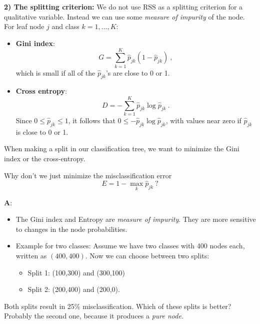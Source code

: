 \documentclass[
  10pt,
  ignorenonframetext,
]{beamer}
\providecommand{\tightlist}{%
  \setlength{\itemsep}{0pt}\setlength{\parskip}{0pt}}
\begin{document}
\begin{frame}
\textbf{2) The splitting criterion:} We do not use RSS as a splitting
criterion for a qualitative variable. Instead we can use some
\emph{measure of impurity} of the node. For leaf node \(j\) and class
\(k=1,\ldots, K\):

\begin{itemize}
\tightlist
\item
  \textbf{Gini index}: \[
  G=\sum_{k=1}^K \hat{p}_{jk}(1-\hat{p}_{jk}) \ ,
  \] which is small if all of the \(\hat{p}_{jk}\)'s are close to 0 or
  1.
\end{itemize}

\vspace{1mm}

\begin{itemize}
\tightlist
\item
  \textbf{Cross entropy}: \[
  D=-\sum_{k=1}^K \hat{p}_{jk}\log\hat{p}_{jk} \ .
  \] Since \(0\leq\hat{p}_{jk}\leq 1\), it follows that
  \(0\leq -\hat{p}_{jk}\log\hat{p}_{jk}\), with values near zero if
  \(\hat{p}_{jk}\) is close to 0 or 1.
\end{itemize}

When making a split in our classification tree, we want to minimize the
Gini index or the cross-entropy.
\end{frame}

\begin{frame}
Why don't we just minimize the misclassification error
\[E= 1- \max_k{\hat{p}_{jk}} \ ?\]

\textbf{A}:

\begin{itemize}
\item
  The Gini index and Entropy are \emph{measure of impurity}. They are
  more sensitive to changes in the node probabilities.
\item
  Example for two classes: Assume we have two classes with 400 nodes
  each, written as \((400,400)\). Now we can choose between two splits:

  \begin{itemize}
  \tightlist
  \item
    Split 1: (100,300) and (300,100)\\
  \item
    Split 2: (200,400) and (200,0).
  \end{itemize}
\end{itemize}

Both splits result in 25\% misclassification. Which of these splits is
better? Probably the second one, because it produces a \emph{pure node}.
\end{frame}
\end{document}
